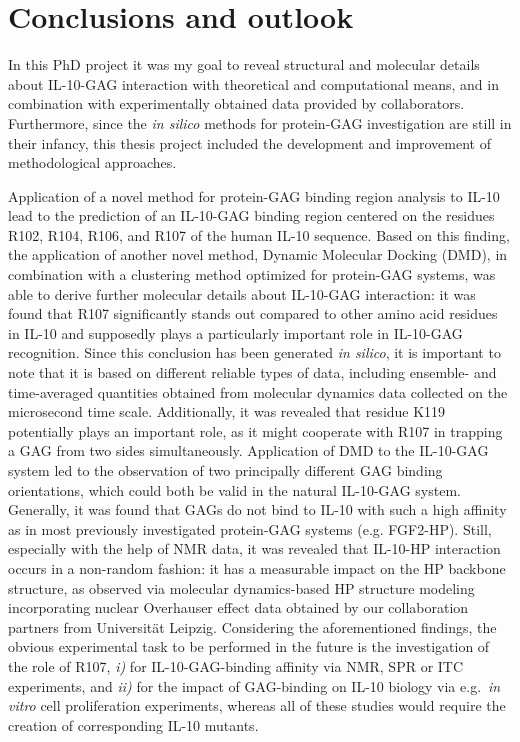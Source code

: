 \chapter{Conclusions and outlook}

In this PhD project it was my goal to reveal structural and molecular details
about IL-10-GAG interaction with theoretical and computational means, and in
combination with experimentally obtained data provided by collaborators.
Furthermore, since the \textit{in silico} methods for protein-GAG investigation
are still in their infancy, this thesis project included the development and
improvement of methodological approaches.

Application of a novel method for protein-GAG binding region analysis to IL-10
lead to the prediction of an IL-10-GAG binding region centered on the residues
R102, R104, R106, and R107 of the human IL-10 sequence. Based on this finding,
the application of another novel method, Dynamic Molecular Docking (DMD), in
combination with a clustering method optimized for protein-GAG systems, was able
to derive further molecular details about IL-10-GAG interaction: it was found
that R107 significantly stands out compared to other amino acid residues in
IL-10 and supposedly plays a particularly important role in IL-10-GAG
recognition. Since this conclusion has been generated \textit{in silico}, it is
important to note that it is based on different reliable types of data,
including ensemble- and time-averaged quantities obtained from molecular
dynamics data collected on the microsecond time scale. Additionally, it was
revealed that residue K119 potentially plays an important role, as it might
cooperate with R107 in trapping a GAG from two sides simultaneously. Application
of DMD to the IL-10-GAG system led to the observation of two principally
different GAG binding orientations, which could both be valid in the natural
IL-10-GAG system. Generally, it was found that GAGs do not bind to IL-10 with
such a high affinity as in most previously investigated protein-GAG systems
(e.g. FGF2-HP). Still, especially with the help of NMR data, it was revealed
that IL-10-HP interaction occurs in a non-random fashion: it has a measurable
impact on the HP backbone structure, as observed via molecular dynamics-based HP
structure modeling incorporating nuclear Overhauser effect data obtained by our
collaboration partners from Universität Leipzig. Considering the aforementioned
findings, the obvious experimental task to be performed in the future is the
investigation of the role of R107, \textit{i)} for IL-10-GAG-binding affinity
via NMR, SPR or ITC experiments, and \textit{ii)} for the impact of GAG-binding
on IL-10 biology via e.g.\ \textit{in vitro} cell proliferation experiments,
whereas all of these studies would require the creation of corresponding IL-10
mutants.


